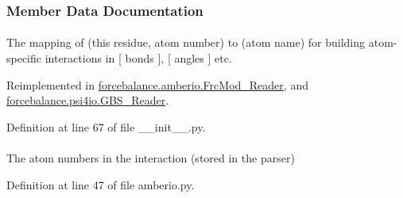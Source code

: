 \subsubsection{\-Member \-Data \-Documentation}
\hypertarget{classforcebalance_1_1BaseReader_a2c46ad6b66cf09a30e917ce4a1997e2a}{
\paragraph[{adict}]{}}\label{classforcebalance_1_1BaseReader_a2c46ad6b66cf09a30e917ce4a1997e2a}


\-The mapping of (this residue, atom number) to (atom name) for building atom-\/specific interactions in \mbox{[} bonds \mbox{]}, \mbox{[} angles \mbox{]} etc. 



\-Reimplemented in \hyperlink{classforcebalance_1_1amberio_1_1FrcMod__Reader_ae3b36131778cad32336f88fdb6d724ee}{forcebalance.\-amberio.\-Frc\-Mod\-\_\-\-Reader}, and \hyperlink{classforcebalance_1_1psi4io_1_1GBS__Reader_aa7cbae977f7e9a4e14ba1d45f62bb5fa}{forcebalance.\-psi4io.\-G\-B\-S\-\_\-\-Reader}.



\-Definition at line 67 of file \-\_\-\-\_\-init\-\_\-\-\_\-.\-py.

\hypertarget{classforcebalance_1_1amberio_1_1Mol2__Reader_ac6144080884f44ad7992e3045cb7a6fd}{
\paragraph[{atom}]{}}\label{classforcebalance_1_1amberio_1_1Mol2__Reader_ac6144080884f44ad7992e3045cb7a6fd}


\-The atom numbers in the interaction (stored in the parser) 



\-Definition at line 47 of file amberio.\-py.


